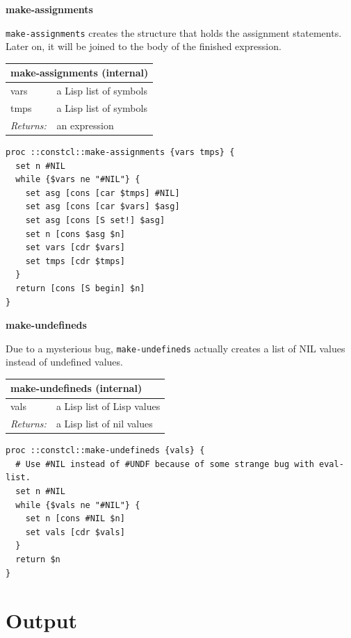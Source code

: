 \documentclass[twoside,9pt]{report}
\begin{document}
\textbf{make-assignments}


\texttt{make-assignments} creates the structure that holds the assignment statements. Later on, it will be joined to the body of the finished expression.

\begin{tabular}{ |l l| }
\hline
\multicolumn{2}{|l|}{make-assignments (internal)} \\
\hline
vars & a Lisp list of symbols \\
tmps & a Lisp list of symbols \\
\textit{Returns:} & an expression \\
\hline
\end{tabular}

\noindent\makebox[\linewidth]{\rule{\linewidth}{0.4pt}}
\begin{lstlisting}
proc ::constcl::make-assignments {vars tmps} {
  set n #NIL
  while {$vars ne "#NIL"} {
    set asg [cons [car $tmps] #NIL]
    set asg [cons [car $vars] $asg]
    set asg [cons [S set!] $asg]
    set n [cons $asg $n]
    set vars [cdr $vars]
    set tmps [cdr $tmps]
  }
  return [cons [S begin] $n]
}
\end{lstlisting}
\noindent\makebox[\linewidth]{\rule{\linewidth}{0.4pt}}

\textbf{make-undefineds}


Due to a mysterious bug, \texttt{make-undefineds} actually creates a list of NIL values instead of undefined values.

\begin{tabular}{ |l l| }
\hline
\multicolumn{2}{|l|}{make-undefineds (internal)} \\
\hline
vals & a Lisp list of Lisp values \\
\textit{Returns:} & a Lisp list of nil values \\
\hline
\end{tabular}

\noindent\makebox[\linewidth]{\rule{\linewidth}{0.4pt}}
\begin{lstlisting}
proc ::constcl::make-undefineds {vals} {
  # Use #NIL instead of #UNDF because of some strange bug with eval-list.
  set n #NIL
  while {$vals ne "#NIL"} {
    set n [cons #NIL $n]
    set vals [cdr $vals]
  }
  return $n
}
\end{lstlisting}
\noindent\makebox[\linewidth]{\rule{\linewidth}{0.4pt}}
\chapter{Output}
\label{output}
\end{document}
